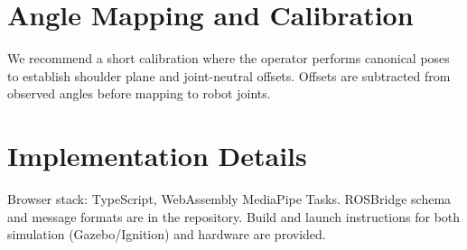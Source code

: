 \documentclass[manuscript,screen]{acmart} %
\begin{document}



\appendix
\section{Angle Mapping and Calibration}
We recommend a short calibration where the operator performs canonical poses to establish shoulder plane and joint-neutral offsets. Offsets are subtracted from observed angles before mapping to robot joints.

\section{Implementation Details}
Browser stack: TypeScript, WebAssembly MediaPipe Tasks. ROSBridge schema and message formats are in the repository. Build and launch instructions for both simulation (Gazebo/Ignition) and hardware are provided.
\end{document}
